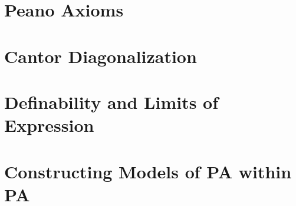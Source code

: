 \documentclass[../../../main.tex]{subfiles}
\begin{document}

\section{Peano Axioms}
\section{Cantor Diagonalization}
\section{Definability and Limits of Expression}
\section{Constructing Models of PA within PA}

\printbibliography[
    heading=subbibintoc,
    title={References}
]
\end{document}
